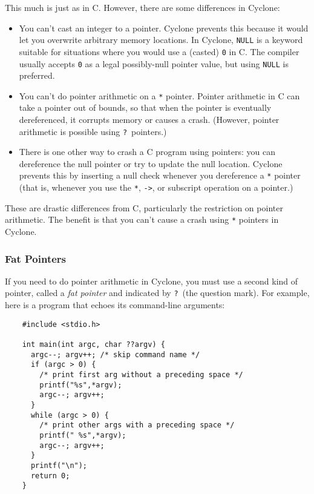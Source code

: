 This much is just as in C\@.  However, there are some differences in
Cyclone:
\begin{itemize}
\item You can't cast an integer to a pointer.  Cyclone prevents this
  because it would let you overwrite arbitrary memory locations.  In
  Cyclone, \texttt{NULL} is a keyword suitable for situations where
  you would use a (casted) \texttt{0} in C\@.  The compiler usually
  accepts \texttt{0} as a legal possibly-null pointer value, but using
  \texttt{NULL} is preferred.
\item You can't do pointer arithmetic on a \texttt{*} pointer.
  Pointer arithmetic in C can take a pointer out of bounds, so that
  when the pointer is eventually dereferenced, it corrupts memory or
  causes a crash.  (However, pointer arithmetic is possible
  using \texttt{?}\ pointers.)
\item There is one other way to crash a C program using pointers: you
  can dereference the null pointer or try to update the null location.
  Cyclone prevents this by inserting a null check whenever you
  dereference a \texttt{*} pointer (that is, whenever you use the
  \texttt{*}, \texttt{->}, or subscript operation on a pointer.)
\end{itemize}

These are drastic differences from C, particularly the restriction on
pointer arithmetic.  The benefit is that you can't cause a crash using
\texttt{*} pointers in Cyclone.

\subsubsection*{Fat Pointers}

If you need to do pointer arithmetic in Cyclone, you must use a second
kind of pointer, called a \emph{fat pointer} and indicated by \texttt{?}\ 
(the question mark).  For
example, here is a program that echoes its command-line arguments:
\begin{verbatim}
    #include <stdio.h>

    int main(int argc, char ??argv) {
      argc--; argv++; /* skip command name */
      if (argc > 0) {
        /* print first arg without a preceding space */
        printf("%s",*argv);
        argc--; argv++;
      }
      while (argc > 0) {
        /* print other args with a preceding space */
        printf(" %s",*argv);
        argc--; argv++;
      }
      printf("\n");
      return 0;
    }
\end{verbatim}

